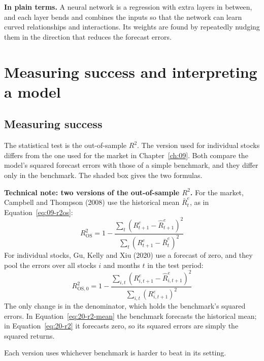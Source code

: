 \noindent\textbf{In plain terms.} A neural network is a regression with extra layers in between, and each layer bends and combines the inputs so that the network can learn curved relationships and interactions. Its weights are found by repeatedly nudging them in the direction that reduces the forecast errors.

\section{Measuring success and interpreting a model}
\label{sec:20-measure}

\subsection{Measuring success}

The statistical test is the out-of-sample $R^2$. The version used for individual stocks differs from the one used for the market in Chapter~\ref{ch:09}. Both compare the model's squared forecast errors with those of a simple benchmark, and they differ only in the benchmark. The shaded box gives the two formulas.

\begin{technote}
\textbf{Technical note: two versions of the out-of-sample $R^2$.} For the market, Campbell and Thompson (2008) use the historical mean $\bar{R}^{e}_t$, as in Equation~\eqref{eq:09-r2os}:
\begin{equation}
  R^2_{\text{OS}} = 1 - \frac{\sum_{t} \left(R^{e}_{t+1} - \hat{R}^{e}_{t+1}\right)^2}{\sum_{t} \left(R^{e}_{t+1} - \bar{R}^{e}_t\right)^2}
  \label{eq:20-r2-mean}
\end{equation}
For individual stocks, Gu, Kelly and Xiu (2020) use a forecast of zero, and they pool the errors over all stocks $i$ and months $t$ in the test period:
\begin{equation}
  R^2_{\text{OS},0} = 1 - \frac{\sum_{i,t} \left(R^{e}_{i,t+1} - \hat{R}^{e}_{i,t+1}\right)^2}{\sum_{i,t} \left(R^{e}_{i,t+1}\right)^2}
  \label{eq:20-r2}
\end{equation}
The only change is in the denominator, which holds the benchmark's squared errors. In Equation~\eqref{eq:20-r2-mean} the benchmark forecasts the historical mean; in Equation~\eqref{eq:20-r2} it forecasts zero, so its squared errors are simply the squared returns.
\end{technote}

Each version uses whichever benchmark is harder to beat in its setting.

